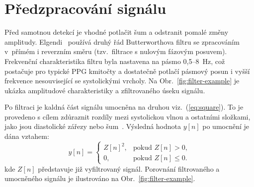 \section{Předzpracování signálu}
\label{sec:preprocess}

Před samotnou detekcí je vhodné potlačit šum a odstranit pomalé změny amplitudy.
Elgendi~\cite{Elgendi2013} používá druhý řád Butterworthova filtru se zpracováním v~přímém i reverzním směru (tzv.~filtrace s nulovým fázovým posuvem).
Frekvenční charakteristika filtru byla nastavena na pásmo 0,5--8~Hz, což postačuje pro typické PPG kmitočty a dostatečně potlačí pásmový posun i vyšší frekvence nesouvisející se systolickými vrcholy.
Na Obr.~\ref{fig:filter-example} je ukázka amplitudové charakteristiky a zfiltrovaného úseku signálu.

Po filtraci je kaldná část signálu umocněna na druhou viz.~(\ref{eq:square}).
To je provedeno s cílem zdůraznit rozdíly mezi systolickou vlnou a ostatními složkami, jako jsou diastolické zářezy nebo šum~\cite{Elgendi2013}.
Výsledná hodnota $y[n]$ po umocnění je dána vztahem:
\begin{equation}
	\label{eq:square}
		y[n] =
		\begin{cases}
			Z[n]^2, & \text{pokud } Z[n] > 0,\\[1mm]
			0, & \text{pokud } Z[n] \le 0.
		\end{cases}
	\end{equation}
kde $Z[n]$ představuje již vyfiltrovaný signál.
Porovnání filtrovaného a umocněného signálu je ilustrováno na Obr.~\ref{fig:filter-example}.

